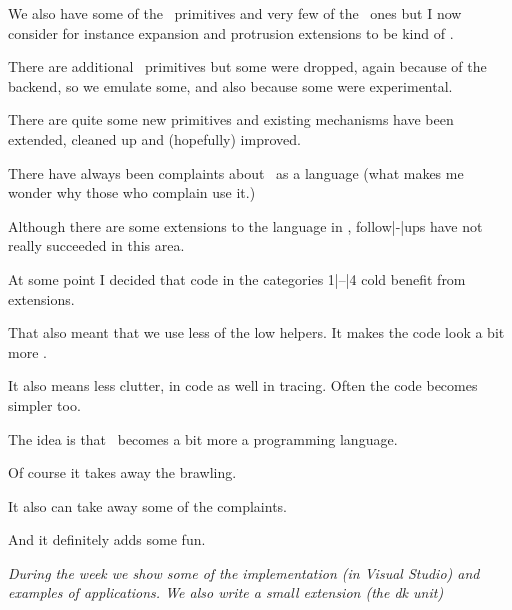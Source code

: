 \startitem
    We also have some of the \ETEX\ primitives and very few of the \PDFTEX\ ones
    but I now consider for instance expansion and protrusion extensions to be
    kind of \ETEX.
\stopitem

\startitem
    There are additional \LUATEX\ primitives but some were dropped, again because
    of the backend, so we emulate some, and also because some were experimental.
\stopitem

\startitem
    There are quite some new primitives and existing mechanisms have been extended,
    cleaned up and (hopefully) improved.
\stopitem

\stopitemize


\starttitle[title=The shift]

\startitemize

\startitem
    There have always been complaints about \TEX\ as a language (what makes me
    wonder why those who complain use it.)
\stopitem

\startitem
    Although there are some extensions to the language in \ETEX, follow|-|ups have
    not really succeeded in this area.
\stopitem

\startitem
    At some point I decided that code in the categories 1|--|4 cold benefit from
    extensions.
\stopitem

\startitem
    That also meant that we use less of the low helpers. It makes the code look a
    bit more \TEX.
\stopitem

\startitem
    It also means less clutter, in code as well in tracing. Often the code
    becomes simpler too.
\stopitem

\startitem
    The idea is that \TEX\ becomes a bit more a programming language.
\stopitem

\startitem
    Of course it takes away the  brawling.
\stopitem

\startitem
    It also can take away some of the complaints.
\stopitem

\startitem
    And it definitely adds some fun.
\stopitem

\stopitemize

{\em During the week we show some of the implementation (in Visual Studio) and
examples of applications. We also write a small extension (the {\tttf dk} unit)}

\stoptitle

\stopdocument
